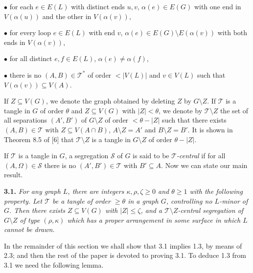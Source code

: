 \hspace*{12pt}$\bullet$ for each $e \in E(L)$ with distinct ends $u, v$, $\alpha(e) \in E(G)$ with one end in $V(\alpha(u))$ and the other in $V(\alpha(v))$,

\hspace*{12pt}$\bullet$ for every loop $e \in E(L)$ with end $v$, $\alpha(e) \in E(G) \setminus E(\alpha(v))$ with both ends in $V(\alpha(v))$,

\hspace*{12pt}$\bullet$ for all distinct $e, f \in E(L)$, $\alpha(e) \ne \alpha(f)$,

\hspace*{12pt}$\bullet$ there is no $(A, B) \in \mathscr{T}^*$ of order $< |V(L)|$ and $v \in V(L)$ such that $V(\alpha(v)) \subseteq V(A)$.

If $Z \subseteq V(G)$, we denote the graph obtained by deleting $Z$ by $G \setminus Z$. If $\mathscr{T}$ is a tangle in $G$ of order $\theta$ and $Z \subseteq V(G)$ with $|Z| < \theta$, we denote by $\mathscr{T} \setminus Z$ the set of all separations $(A', B')$ of $G \setminus Z$ of order $<\theta - |Z|$ such that there exists $(A, B) \in \mathscr{T}$ with $Z \subseteq V(A \cap B)$, $A \setminus Z = A'$ and $B \setminus Z = B'$. It is shown in Theorem 8.5 of [6] that $\mathscr{T} \setminus Z$ is a tangle in $G \setminus Z$ of order $\theta - |Z|$.

If $\mathscr{T}$ is a tangle in $G$, a segregation $\mathscr{S}$ of $G$ is said to be \textit{$\mathscr{T}$-central} if for all $(A, \Omega) \in \mathscr{S}$ there is no $(A', B') \in \mathscr{T}$ with $B' \subseteq A$. Now we can state our main result.

\textbf{3.1.} \textit{For any graph $L$, there are integers $\kappa, \rho, \zeta \ge 0$ and $\theta \ge 1$ with the following property. Let $\mathscr{T}$ be a tangle of order $\ge \theta$ in a graph $G$, controlling no $L$-minor of $G$. Then there exists $Z \subseteq V(G)$ with $|Z| \le \zeta$, and a $\mathscr{T} \setminus Z$-central segregation of $G \setminus Z$ of type $(\rho, \kappa)$ which has a proper arrangement in some surface in which $L$ cannot be drawn.}

In the remainder of this section we shall show that 3.1 implies 1.3, by means of 2.3; and then the rest of the paper is devoted to proving 3.1. To deduce 1.3 from 3.1 we need the following lemma.
